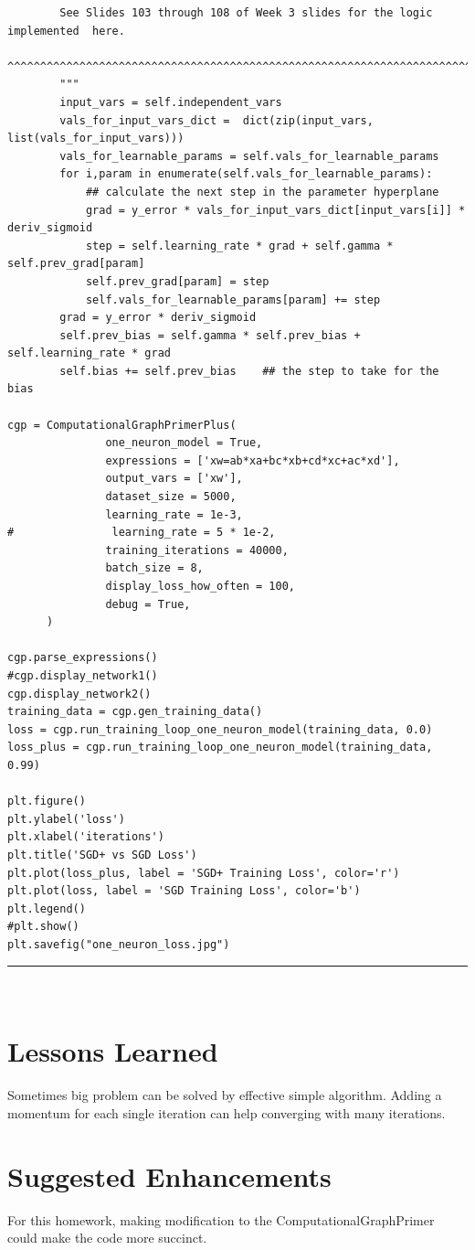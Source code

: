 \documentclass{article}
\begin{document}
\begin{verbatim}
        See Slides 103 through 108 of Week 3 slides for the logic implemented  here.
        ^^^^^^^^^^^^^^^^^^^^^^^^^^^^^^^^^^^^^^^^^^^^^^^^^^^^^^^^^^^^^^^^^^^^^^^^^^^^
        """
        input_vars = self.independent_vars
        vals_for_input_vars_dict =  dict(zip(input_vars, list(vals_for_input_vars)))
        vals_for_learnable_params = self.vals_for_learnable_params
        for i,param in enumerate(self.vals_for_learnable_params):
            ## calculate the next step in the parameter hyperplane
            grad = y_error * vals_for_input_vars_dict[input_vars[i]] * deriv_sigmoid
            step = self.learning_rate * grad + self.gamma * self.prev_grad[param]
            self.prev_grad[param] = step
            self.vals_for_learnable_params[param] += step
        grad = y_error * deriv_sigmoid
        self.prev_bias = self.gamma * self.prev_bias + self.learning_rate * grad
        self.bias += self.prev_bias    ## the step to take for the bias

cgp = ComputationalGraphPrimerPlus(
               one_neuron_model = True,
               expressions = ['xw=ab*xa+bc*xb+cd*xc+ac*xd'],
               output_vars = ['xw'],
               dataset_size = 5000,
               learning_rate = 1e-3,
#               learning_rate = 5 * 1e-2,
               training_iterations = 40000,
               batch_size = 8,
               display_loss_how_often = 100,
               debug = True,
      )

cgp.parse_expressions()
#cgp.display_network1()
cgp.display_network2()
training_data = cgp.gen_training_data()
loss = cgp.run_training_loop_one_neuron_model(training_data, 0.0)
loss_plus = cgp.run_training_loop_one_neuron_model(training_data, 0.99)

plt.figure()
plt.ylabel('loss')
plt.xlabel('iterations')
plt.title('SGD+ vs SGD Loss')
plt.plot(loss_plus, label = 'SGD+ Training Loss', color='r')
plt.plot(loss, label = 'SGD Training Loss', color='b')
plt.legend()
#plt.show()
plt.savefig("one_neuron_loss.jpg")

\end{verbatim}
\vspace{-0.45in}
\textcolor{red}{\rule[-0.3in]{6.1in}{0.03in}}\\

\section{Lessons Learned}
Sometimes big problem can be solved by effective simple algorithm. Adding a momentum for each single iteration can help converging with many iterations.
\section{Suggested Enhancements}
For this homework, making modification to the ComputationalGraphPrimer could make the code more succinct.
\end{document}
